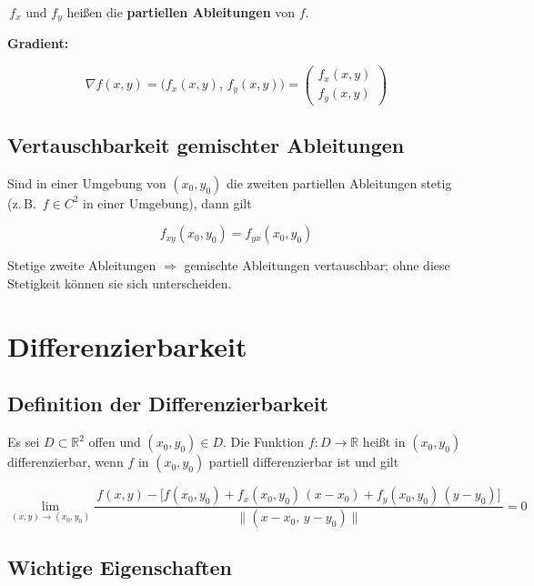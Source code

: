 \documentclass[a4paper,11pt,oneside,open=any,parskip=half, DIV=15]{scrreprt}
\begin{document}
      \(\,f_x\) und \(f_y\) heißen die \textbf{partiellen Ableitungen} von \(f\).

      \textbf{Gradient:}
      \begin{importantbox}
      \[
         \nabla f(x,y)=\big(f_x(x,y),\,f_y(x,y)\big)
         = \begin{pmatrix} f_x(x,y)\\[0.2em] f_y(x,y) \end{pmatrix}
      \]
      \end{importantbox}

   \subsection*{Vertauschbarkeit gemischter Ableitungen}
      Sind in einer Umgebung von \((x_0,y_0)\) die zweiten partiellen Ableitungen stetig
      (z.\,B.\ \(f\in C^2\) in einer Umgebung), dann gilt
      \begin{importantbox}
      \[
         f_{xy}(x_0,y_0)=f_{yx}(x_0,y_0)
      \]
      \end{importantbox}
      Stetige zweite Ableitungen \(\Rightarrow\) gemischte Ableitungen vertauschbar; ohne diese
      Stetigkeit können sie sich unterscheiden.


\section{Differenzierbarkeit}

   \subsection*{Definition der Differenzierbarkeit}

      Es sei \(D\subset \mathbb{R}^2\) offen und \((x_0,y_0)\in D\).
      Die Funktion \(f:D\to\mathbb{R}\) heißt in \((x_0,y_0)\) differenzierbar, wenn \(f\) in \((x_0,y_0)\) partiell differenzierbar ist und gilt
      \begin{importantbox}
      \[
         \lim_{(x,y)\to(x_0,y_0)}
         \frac{\,f(x,y)-\big[f(x_0,y_0)+f_x(x_0,y_0)\,(x-x_0)+f_y(x_0,y_0)\,(y-y_0)\big]\,}
               {\,\|(x-x_0,\,y-y_0)\|\,}=0
      \]
      \end{importantbox}

   \subsection*{Wichtige Eigenschaften}
\end{document}
